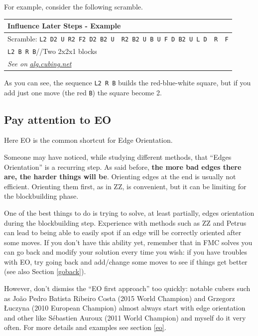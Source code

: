 \documentclass[11pt,a4paper]{book}
\newcommand{\p}{\textquotesingle}
\newcommand{\m}{\texttt}
\newcommand{\ps}{\p\,\,}
\newcommand{\comment}[1]{{\color{gray}\quad//#1}}
\begin{document}
For example, consider the following scramble.

\bigskip
\begin{tabular}{|p{}|}
\hline
\textbf{Influence Later Steps - Example}\\
\hline
Scramble: \m{L2 D2 U R2 F2 D2 B2 U\ps R2 B2 U B U F D B2 U L D\ps R\ps F}\\
\hline
\begin{minipage}[l]{0.650\textwidth}
\m{L2 {\color{red}B} R B}\comment{Two 2x2x1 blocks}
\end{minipage}
\begin{minipage}[c]{0.25\textwidth}

\end{minipage}\\
\hline
\emph{See on }\href{https://alg.cubing.net/?setup=L2_D2_U_R2_F2_D2_B2_U-_R2_B2_U_B_U_F_D_B2_U_L_D-_R-_F&alg=L2_B_R_B_\%2F\%2FTwo_2x2x1_blocks}{\emph{alg.cubing.net}}\\
\hline
\end{tabular}
\bigskip

As you can see, the sequence \m{L2 R B} builds the red-blue-white square, but if you add just one move (the red \m{B}) the square become 2.

\subsection{Pay attention to EO}
\label{EO_attention}

Here EO is the common shortcut for Edge Orientation.

Someone may have noticed, while studying different methods, that “Edges Orientation” is a recurring step. As said before, \textbf{the more bad edges there are, the harder things will be}. Orienting edges at the end is usually not efficient. Orienting them first, as in ZZ, is convenient, but it can be limiting for the blockbuilding phase.

One of the best things to do is trying to solve, at least partially, edges orientation during the blockbuilding step. Experience with methods such as ZZ and Petrus can lead to being able to easily spot if an edge will be correctly oriented after some moves. If you don't have this ability yet, remember that in FMC solves you can go back and modify your solution every time you wish: if you have troubles with EO, try going back and add/change some moves to see if things get better (see also Section \ref{goback}).

However, don't dismiss the ``EO first approach'' too quickly: notable cubers such as João Pedro Batista Ribeiro Costa (2015 World Champion) and Grzegorz Łuczyna (2010 European Champion) almost always start with edge orientation and other like Sébastien Auroux (2011 World Champion) and myself do it very often. For more details and examples see section \ref{eo}.
\end{document}
